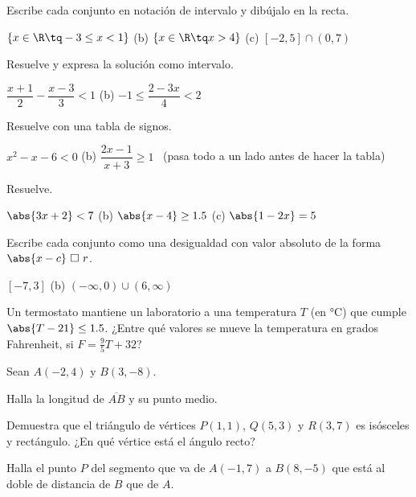 \documentclass[11pt,a4paper]{article}
\begin{document}
\taller
\begin{ejercicios}
\item Escribe cada conjunto en notación de intervalo y dibújalo en la recta.
  \begin{ejercicios}
  \item $\{x\in\R\tq -3\le x<1\}$ \qquad (b) $\{x\in\R\tq x>4\}$ \qquad (c) $[-2,5]\cap(0,7)$
  \end{ejercicios}
\item Resuelve y expresa la solución como intervalo.
  \begin{ejercicios}
  \item $\dfrac{x+1}{2}-\dfrac{x-3}{3}<1$ \qquad (b) $-1\le\dfrac{2-3x}{4}<2$
  \end{ejercicios}
\item Resuelve con una tabla de signos.
  \begin{ejercicios}
  \item $x^2-x-6<0$ \qquad (b) $\dfrac{2x-1}{x+3}\ge 1$ \ (pasa todo a un lado antes de hacer la tabla)
  \end{ejercicios}
\item Resuelve.
  \begin{ejercicios}
  \item $\abs{3x+2}<7$ \qquad (b) $\abs{x-4}\ge 1.5$ \qquad (c) $\abs{1-2x}=5$
  \end{ejercicios}
\item Escribe cada conjunto como una desigualdad con valor absoluto de la forma $\abs{x-c}\ \square\ r$.
  \begin{ejercicios}
  \item $[-7,3]$ \qquad (b) $(-\infty,0)\cup(6,\infty)$
  \end{ejercicios}
\item Un termostato mantiene un laboratorio a una temperatura $T$ (en \si{\degreeCelsius}) que cumple $\abs{T-21}\le 1.5$.
  ¿Entre qué valores se mueve la temperatura en grados Fahrenheit, si $F=\tfrac95T+32$?
\item Sean $A(-2,4)$ y $B(3,-8)$.
  \begin{ejercicios}
  \item Halla la longitud de $\overline{AB}$ y su punto medio.
  \item Demuestra que el triángulo de vértices $P(1,1)$, $Q(5,3)$ y $R(3,7)$ es isósceles y rectángulo. ¿En qué vértice está el ángulo recto?
  \end{ejercicios}
\item Halla el punto $P$ del segmento que va de $A(-1,7)$ a $B(8,-5)$ que está al doble de distancia de $B$ que de $A$.

\end{ejercicios}
\end{document}
